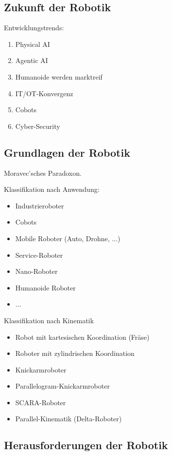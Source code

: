 \documentclass[a4paper]{article}
\begin{document}
\subsection{Zukunft der Robotik}

Entwicklungstrends:

\begin{enumerate}
    \item Physical AI
    \item Agentic AI
    \item Humanoide werden marktreif
    \item IT/OT-Konvergenz
    \item Cobots
    \item Cyber-Security
\end{enumerate}

\subsection{Grundlagen der Robotik}

Moravec'sches Paradoxon.

Klassifikation nach Anwendung:

\begin{itemize}
    \item Industrieroboter
    \item Cobots
    \item Mobile Roboter (Auto, Drohne, ...)
    \item Service-Roboter
    \item Nano-Roboter
    \item Humanoide Roboter
    \item ...
\end{itemize}

Klassifikation nach Kinematik

\begin{itemize}
    \item Robot mit kartesischen Koordination (Fräse)
    \item Roboter mit zylindrischen Koordination
    \item Knickarmroboter
    \item Parallelogram-Knickarmroboter
    \item SCARA-Roboter
    \item Parallel-Kinematik (Delta-Roboter)
\end{itemize}

\subsection{Herausforderungen der Robotik}
\end{document}
